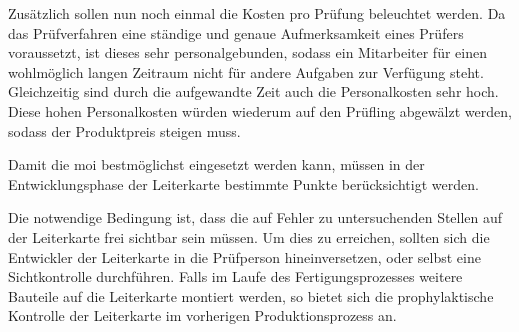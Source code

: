         Zusätzlich sollen nun noch einmal die Kosten pro Prüfung beleuchtet werden.
        Da das Prüfverfahren eine ständige und genaue Aufmerksamkeit eines Prüfers voraussetzt, ist dieses sehr personalgebunden, sodass ein Mitarbeiter für einen wohlmöglich langen Zeitraum nicht für andere Aufgaben zur Verfügung steht.
        Gleichzeitig sind durch die aufgewandte Zeit auch die Personalkosten sehr hoch. \cite{berger_test-_2012}
        Diese hohen Personalkosten würden wiederum auf den Prüfling abgewälzt werden, sodass der Produktpreis steigen muss.

        Damit die \ac{moi} bestmöglichst eingesetzt werden kann, müssen in der Entwicklungsphase der Leiterkarte bestimmte Punkte berücksichtigt werden.

        Die notwendige Bedingung ist, dass die auf Fehler zu untersuchenden Stellen auf der Leiterkarte frei sichtbar sein müssen.
        Um dies zu erreichen, sollten sich die Entwickler der Leiterkarte in die Prüfperson hineinversetzen, oder selbst eine Sichtkontrolle durchführen.
        Falls im Laufe des Fertigungsprozesses weitere Bauteile auf die Leiterkarte montiert werden, so bietet sich die prophylaktische Kontrolle der Leiterkarte im vorherigen Produktionsprozess an. \cite{berger_test-_2012}